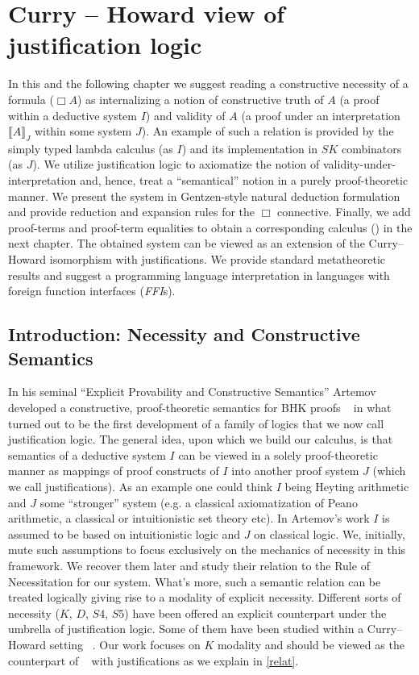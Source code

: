 \chapter{Curry -- Howard view of justification logic}
\label{proposal}
In this and the following chapter
we suggest reading a constructive necessity  
of a formula ($\Box A$) as  internalizing a notion 
of constructive truth of $A$ 
(a proof within a deductive system $I$) 
and validity of $A$
(a proof under an interpretation  $\llbracket A \rrbracket_J$ within some system $J$).  An example of such a relation is provided by the simply typed lambda calculus
(as $I$) 
and its implementation in $SK$ combinators (as $J$). 
We utilize justification logic to axiomatize the notion of 
validity-under-interpretation and, hence, 
treat  a  ``semantical'' notion in a purely
 proof-theoretic manner. We present the system  in 
Gentzen-style  natural deduction formulation  and provide reduction and expansion rules for the $\Box$ connective. Finally, we add proof-terms and proof-term equalities
to obtain a corresponding calculus ({}) in the next chapter.
The obtained system can be viewed as an extension of the Curry--Howard 
isomorphism with justifications.
We provide standard metatheoretic results  and suggest a 
programming language  interpretation in  languages with foreign function interfaces (\textit{FFI}s).

\section{Introduction: Necessity and Constructive Semantics}
In his seminal ``Explicit Provability and Constructive Semantics'' \cite{Artemov2001} Artemov developed a constructive, proof-theoretic semantics for 
\acs{BHK} proofs ~\cite{Troelstra1988} 
in what turned out to be the first development of a family of logics that we now call justification logic.
The general idea, upon which we build our calculus, is that semantics of a deductive system $I$ can be viewed in a solely proof-theoretic manner 
as mappings of proof constructs of $I$ into another proof system $J$ (which we call justifications).
As an example one could think  $I$  being  Heyting arithmetic and $J$ some  ``stronger'' system 
(e.g. a classical axiomatization of Peano arithmetic, a classical or intuitionistic set theory etc). 
 In Artemov's work $I$ is assumed to be
based on intuitionistic logic and $J$  on classical logic. 
We, initially,  mute such assumptions to focus exclusively 
on the mechanics of necessity in this framework.
We recover them later and study  their relation  to  
the Rule of Necessitation for our system.
What's more,  such a semantic relation can be treated 
logically giving  rise to a modality of explicit necessity. 
Different sorts of necessity
($K$, $D$, $S4$, $S5$) have been offered  an explicit counterpart under the umbrella of justification logic. Some of them have been studied within a
Curry--Howard setting ~\cite{ArtBon07LFCS}. Our work
focuses on  $K$ modality and  should be viewed as the  counterpart of ~\cite{Bellin2001} with justifications as we explain in \ref{relat}.
